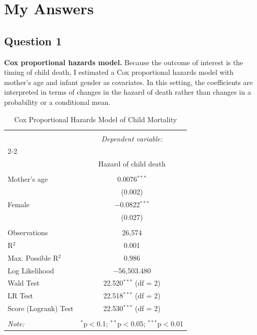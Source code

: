\documentclass[12pt,letterpaper]{article}
\begin{document}
\newpage
\section*{My Answers}

\subsection*{Question 1}

\noindent \textbf{Cox proportional hazards model.}
Because the outcome of interest is the timing of child death, I estimated a Cox proportional hazards model with mother's age and infant gender as covariates. In this setting, the coefficients are interpreted in terms of changes in the hazard of death rather than changes in a probability or a conditional mean.\\

\begin{table}[!htbp] \centering 
	\caption{Cox Proportional Hazards Model of Child Mortality} 
	\label{} 
	\begin{tabular}{@{\extracolsep{5pt}}lc} 
		\\[-1.8ex]\hline 
		\hline \\[-1.8ex] 
		& \multicolumn{1}{c}{\textit{Dependent variable:}} \\ 
		\cline{2-2} 
		\\[-1.8ex] & Hazard of child death \\ 
		\hline \\[-1.8ex] 
		Mother's age & 0.0076$^{***}$ \\ 
		& (0.002) \\ 
		Female & $-$0.0822$^{***}$ \\ 
		& (0.027) \\ 
		\hline \\[-1.8ex] 
		Observations & 26,574 \\ 
		R$^{2}$ & 0.001 \\ 
		Max. Possible R$^{2}$ & 0.986 \\ 
		Log Likelihood & $-$56,503.480 \\ 
		Wald Test & 22.520$^{***}$ (df = 2) \\ 
		LR Test & 22.518$^{***}$ (df = 2) \\ 
		Score (Logrank) Test & 22.530$^{***}$ (df = 2) \\ 
		\hline 
		\hline \\[-1.8ex] 
		\textit{Note:}  & \multicolumn{1}{r}{$^{*}$p$<$0.1; $^{**}$p$<$0.05; $^{***}$p$<$0.01} \\ 
	\end{tabular} 
\end{table} 
\end{document}
